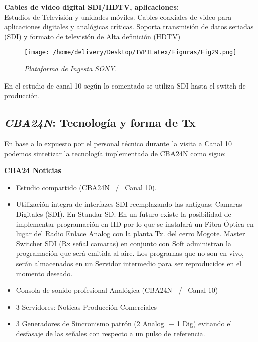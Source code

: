 \documentclass[a4paper,11pt]{article} %
\begin{document}
\textbf{Cables de video digital SDI/HDTV, aplicaciones:}
\\

Estudios de Televisión y unidades móviles.
Cables coaxiales de video para aplicaciones digitales y analógicas
críticas.
Soporta transmisión de datos seriadas (SDI) y formato de televisión de
Alta definición (HDTV)


\begin{figure}[h!] 
\centering
\texttt{[image: /home/delivery/Desktop/TVPILatex/Figuras/Fig29.png]}
\caption{\emph{Plataforma de Ingesta SONY.}}
\end{figure}

\newpage
En el estudio de canal 10 según lo comentado se utiliza SDI hasta el
switch de producción.

\subsection{\textbf{\emph{CBA24N}}: Tecnolog\'ia y forma de Tx}
En base a lo expuesto por el personal t\'ecnico durante la visita a
Canal 10 podemos sintetizar la tecnolog\'ia implementada de CBA24N como
sigue:

\textbf{CBA24 Noticias}
\\

\begin{itemize}
\item Estudio compartido (CBA24N \ / \ Canal 10).
\item Utilizaci\'on integra de interfazes SDI reemplazando las antiguas:
  \subitem Camaras Digitales (SDI). En Standar SD. En un futuro existe
la posibilidad de implementar programaci\'on en HD por lo que se
instalar\'a un Fibra \'Optica en lugar del Radio Enlace Analog con la
planta Tx. del cerro Mogote.
  \subitem Master Switcher SDI (Rx se\~nal camaras) en conjunto con
Soft administran la programaci\'on que ser\'a emitida al aire. Los
programas que no son en vivo, ser\'an almacenados en un Servidor
intermedio para ser reproducidos en el momento deseado.
\item Consola de sonido profesional Anal\'ogica (CBA24N \ / \ Canal 10)
\item 3 Servidores: 
  \subitem Noticas
  \subitem Producci\'on
  \subitem Comerciales 
\item 3 Generadores de Sincronismo patr\'on (2 Analog. + 1 Dig)
evitando el desfasaje de las se\~nales con respecto a un pulso de
referencia. 
\end{itemize}
\end{document}
